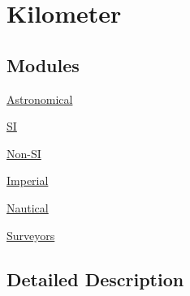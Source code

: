 \hypertarget{group___e_g_x_math-_conversions-_length_conversions-_s_i-_kilometer}{}\section{Kilometer}
\label{group___e_g_x_math-_conversions-_length_conversions-_s_i-_kilometer}
\subsection*{Modules}
\begin{DoxyCompactItemize}
\item 
\mbox{\hyperlink{group___e_g_x_math-_conversions-_length_conversions-_s_i-_kilometer-_astronomical}{Astronomical}}
\item 
\mbox{\hyperlink{group___e_g_x_math-_conversions-_length_conversions-_s_i-_kilometer-_s_i}{SI}}
\item 
\mbox{\hyperlink{group___e_g_x_math-_conversions-_length_conversions-_s_i-_kilometer-_non-_s_i}{Non-\/\+SI}}
\item 
\mbox{\hyperlink{group___e_g_x_math-_conversions-_length_conversions-_s_i-_kilometer-_imperial}{Imperial}}
\item 
\mbox{\hyperlink{group___e_g_x_math-_conversions-_length_conversions-_s_i-_kilometer-_nautical}{Nautical}}
\item 
\mbox{\hyperlink{group___e_g_x_math-_conversions-_length_conversions-_s_i-_kilometer-_surveyors}{Surveyors}}
\end{DoxyCompactItemize}


\subsection{Detailed Description}
